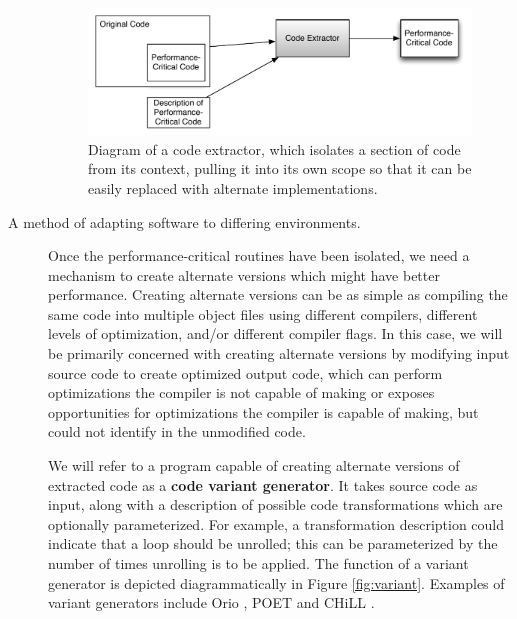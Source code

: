 \documentclass[msthesis,justified,copyright,final,numbers,sort&compress,
gsmodern,amstex,natbib]{uothesis}
\begin{document}
\begin{description}
\begin{figure}[tbp]
\centering
\includegraphics[width=\textwidth]{extractor.pdf}
\caption[Diagram of a code extractor]{Diagram of a code extractor, which isolates a section of code from its context, pulling it into its own scope so that it can be easily replaced with alternate implementations.}
\label{fig:extractor}
\end{figure}

\item[A method of adapting software to differing environments.]

Once the performance-critical routines have been isolated, we need a mechanism to create alternate versions which might have better performance. Creating alternate versions can be as simple as compiling the same code into multiple object files using different compilers, different levels of optimization, and/or different compiler flags. In this case, we will be primarily concerned with creating alternate versions by modifying input source code to create optimized output code, which can perform optimizations the compiler is not capable of making or exposes opportunities for optimizations the compiler is capable of making, but could not identify in the unmodified code. 

We will refer to a program capable of creating alternate versions of extracted code as a \textbf{code variant generator}. It takes source code as input, along with a description of possible code transformations which are optionally parameterized. For example, a transformation description could indicate that a loop should be unrolled; this can be parameterized by the number of times unrolling is to be applied. The function of a variant generator is depicted diagrammatically in Figure \ref{fig:variant}. Examples of variant generators include Orio \cite{orio,orio2,orio3}, POET \cite{poet} and CHiLL \cite{chill,full,rudy,interface,shreyas}.


\end{description}
\end{document}
